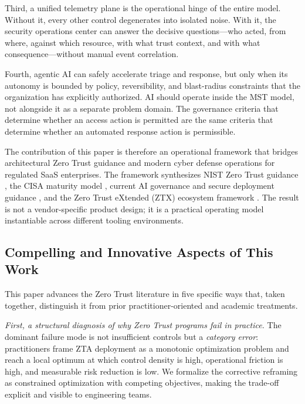 \documentclass[acmlarge]{acmart}
\begin{document}
Third, a unified telemetry plane is the operational hinge of the entire model.
Without it, every other control degenerates into isolated noise. With it, the
security operations center can answer the decisive questions---who acted, from where,
against which resource, with what trust context, and with what consequence---without
manual event correlation.

Fourth, agentic AI can safely accelerate triage and response, but only when its
autonomy is bounded by policy, reversibility, and blast-radius constraints that the
organization has explicitly authorized. AI should operate inside the MST model, not
alongside it as a separate problem domain. The governance criteria that determine
whether an access action is permitted are the same criteria that determine whether
an automated response action is permissible.

The contribution of this paper is therefore an operational framework that bridges
architectural Zero Trust guidance and modern cyber defense operations for regulated SaaS
enterprises. The framework synthesizes NIST Zero Trust guidance \cite{rose2020,chandramouli2023}, the CISA maturity model \cite{cisa2023}, current AI governance and
secure deployment guidance \cite{tabassi2023,autio2024,nsa2024,aidatasec2025,ncsc2023,owasp2025}, and the Zero Trust eXtended (ZTX) ecosystem framework \cite{cunningham2018}. The
result is not a vendor-specific product design; it is a practical operating model
instantiable across different tooling environments.

\subsection{Compelling and Innovative Aspects of This Work}
\label{sec:contributions}

This paper advances the Zero Trust literature in five specific ways that, taken
together, distinguish it from prior practitioner-oriented and academic
treatments.

\textit{First, a structural diagnosis of why Zero Trust programs fail in
practice.} The dominant failure mode is not insufficient controls but a
\textit{category error}: practitioners frame ZTA deployment as a monotonic
optimization problem and reach a local optimum at which control density is
high, operational friction is high, and measurable risk reduction is low. We
formalize the corrective reframing as constrained optimization with competing
objectives, making the trade-off explicit and visible to engineering teams.
\end{document}

